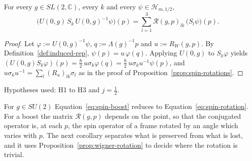 \begin{proposition}\label{prop:spin-boost}
	For every $g\in SL(2,\mathbb{C})$, every $k$ and every $\psi\in\mathcal{H}_{m,1/2}$,
	\begin{equation}\label{eq:spin-boost}
		\big(U(0,g)\,S_k\,U(0,g)^{-1}\psi\big)(p)=\sum_{l=1}^3\mathcal{R}(g,p)_{lk}\,\big(S_l\psi\big)(p).
	\end{equation}
\end{proposition}

\begin{proof}
	Let $\varphi:=U(0,g)^{-1}\psi$, $q:=\Lambda(g)^{-1}p$ and $u:=R_W(g,p)$. By Definition~\ref{def:induced-rep}, $\psi(p)=u\,\varphi(q)$. Applying $U(0,g)$ to $S_k\varphi$ yields $(U(0,g)S_k\varphi)(p)=\frac\hbar2\,u\sigma_k\varphi(q)=\frac\hbar2\,u\sigma_ku^{-1}\psi(p)$, and $u\sigma_ku^{-1}=\sum_l(R_u)_{lk}\sigma_l$ as in the proof of Proposition~\ref{prop:spin-rotations}.
\end{proof}

\noindent Hypotheses used: H1 to H3 and $j=\frac12$.

For $g\in SU(2)$ Equation~\eqref{eq:spin-boost} reduces to Equation~\eqref{eq:spin-rotation}. For a boost the matrix $\mathcal{R}(g,p)$ depends on the point, so that the conjugated operator is, at each $p$, the spin operator of a frame rotated by an angle which varies with $p$. The next corollary separates what is preserved from what is lost, and it uses Proposition~\ref{prop:wigner-rotation} to decide where the rotation is trivial.

